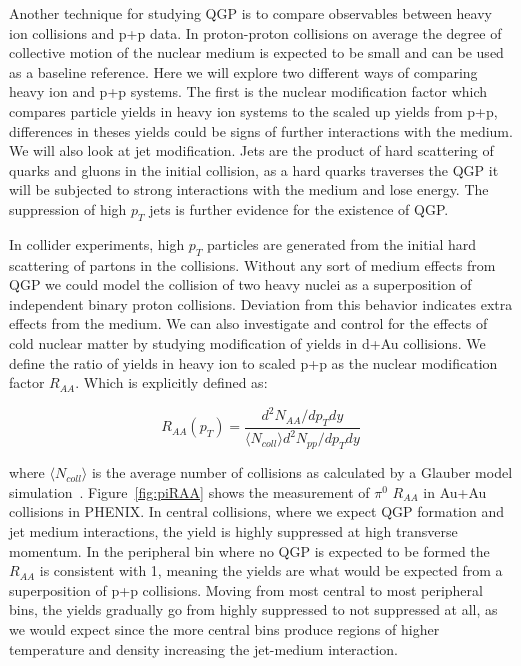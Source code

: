Another technique for studying QGP is to compare observables between heavy ion collisions and p+p data. In proton-proton collisions on average the degree of collective motion of the nuclear medium is expected to be small and can be used as a baseline reference. Here we will explore two different ways of comparing heavy ion and p+p systems. The first is the nuclear modification factor which compares particle yields in  heavy ion systems to the scaled up yields from p+p, differences in theses yields could be signs of further interactions with the medium. We will also look at jet modification. Jets are the product of hard scattering of quarks and gluons in the initial collision, as a hard quarks traverses the QGP it will be subjected to strong interactions with the medium and lose energy. The suppression of high $p_T$ jets is further evidence for the existence of QGP.

In collider experiments, high $p_T$ particles are generated from the initial hard scattering of partons in the collisions. Without any sort of medium effects from QGP we could model the collision of two heavy nuclei as a superposition of independent binary proton collisions. Deviation from this behavior indicates extra effects from the medium. We can also investigate and control for the effects of cold nuclear matter by studying modification of yields in d+Au collisions. We define the ratio of yields in heavy ion to scaled p+p as the nuclear modification factor $R_{AA}$. Which is explicitly defined as:

\begin{equation}\label{eq:RAAdef}
R_{AA}(p_T) = \frac{d^2N_{AA}/dp_Tdy}{\langle N_{coll} \rangle d^2N_{pp}/dp_Tdy} 
\end{equation}

where $ \langle N_{coll} \rangle $ is the average number of collisions as calculated by a Glauber model simulation~\cite{glaub}. Figure~\ref{fig:piRAA} shows the measurement of $\pi^0$ $ R_{AA}$ in Au+Au collisions in PHENIX. In central collisions, where we expect QGP formation and jet medium interactions, the yield is highly suppressed at high transverse momentum. In the peripheral bin where no QGP is expected to be formed the $R_{AA}$ is consistent with 1, meaning the yields are what would be expected from a superposition of p+p collisions. Moving from most central to most peripheral bins, the yields gradually go from highly suppressed to not suppressed at all, as we would expect since the more central bins produce regions of higher temperature and density increasing the jet-medium interaction.

